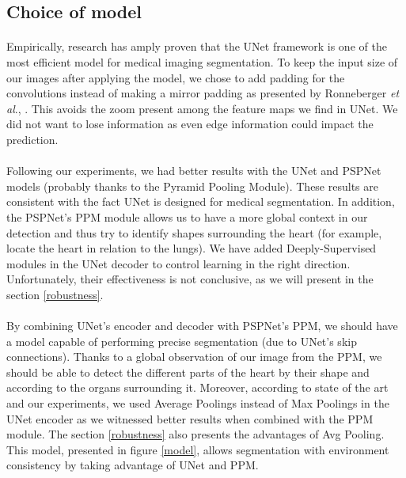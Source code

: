\documentclass[english]{article}
\newcommand{\etal}{\textit{et al}., }
\begin{document}
\subsection{Choice of model}
\paragraph{}
Empirically, research has amply proven that the UNet framework is one of the most efficient model for medical imaging segmentation.
To keep the input size of our images after applying the model, we chose to add padding for the convolutions instead of making a mirror padding as presented by Ronneberger \etal\cite{UNet}.
This avoids the zoom present among the feature maps we find in UNet. We did not want to lose information as even edge information could impact the prediction.
\paragraph{}
Following our experiments, we had better results with the UNet and PSPNet models (probably thanks to the Pyramid Pooling Module). These results are consistent with the fact UNet is designed for medical segmentation.
In addition, the PSPNet's PPM module allows us to have a more global context in our detection and thus try to identify shapes surrounding the heart (for example, locate the heart in relation to the lungs).
We have added Deeply-Supervised modules in the UNet decoder to control learning in the right direction. Unfortunately, their effectiveness is not conclusive, as we will present in the section \ref{robustness}.
\paragraph{}By combining UNet's encoder and decoder with PSPNet's PPM, we should have a model capable of performing precise segmentation (due to UNet's skip connections).
Thanks to a global observation of our image from the PPM, we should be able to detect the different parts of the heart by their shape and according to the organs surrounding it.
Moreover, according to state of the art and our experiments, we used Average Poolings instead of Max Poolings in the UNet encoder as we witnessed better results when combined with the PPM module. The section \ref{robustness} also presents the advantages of Avg Pooling.
This model, presented in figure \ref{model}, allows segmentation with environment consistency by taking advantage of UNet and PPM.
\end{document}
